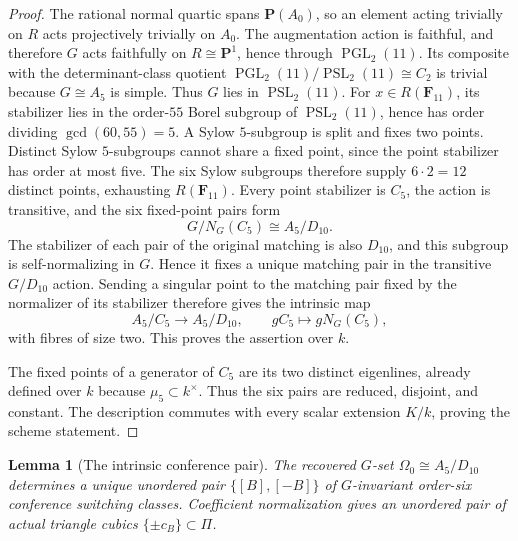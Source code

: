 \documentclass[11pt]{article}
\newtheorem{lemma}[theorem]{Lemma}
\theoremstyle{definition}
\theoremstyle{remark}
\newcommand{\F}{\mathbf F}
\newcommand{\PP}{\mathbf P}
\newcommand{\PGL}{\operatorname{PGL}}
\begin{document}
\begin{proof}
The rational normal quartic spans \(\PP(A_0)\), so an element acting trivially
on \(R\) acts projectively trivially on \(A_0\).  The augmentation action is
faithful, and therefore \(G\) acts faithfully on \(R\cong\PP^1\), hence through
\(\PGL_2(11)\).  Its composite with the determinant-class quotient
\(\PGL_2(11)/\operatorname{PSL}_2(11)\cong C_2\) is trivial because
\(G\cong A_5\) is simple.  Thus \(G\) lies in
\(\operatorname{PSL}_2(11)\).  For \(x\in R(\F_{11})\), its
stabilizer lies in the
order-\(55\) Borel subgroup of \(\operatorname{PSL}_2(11)\), hence has order
dividing \(\gcd(60,55)=5\).  A Sylow \(5\)-subgroup is split and fixes two
points.  Distinct Sylow \(5\)-subgroups cannot share a fixed point, since
the point stabilizer has order at most five.  The six Sylow subgroups
therefore supply \(6\cdot2=12\) distinct points, exhausting \(R(\F_{11})\).
Every point stabilizer is \(C_5\), the action is transitive, and the six
fixed-point pairs form
\[
 G/N_G(C_5)\cong A_5/D_{10}.
\]
The stabilizer of each pair of the original matching is also \(D_{10}\), and
this subgroup is self-normalizing in \(G\).  Hence it fixes a unique matching
pair in the transitive \(G/D_{10}\) action.  Sending a singular point
to the matching pair fixed by the normalizer of its stabilizer therefore
gives the intrinsic map
\[
 A_5/C_5\longrightarrow A_5/D_{10},
 \qquad gC_5\longmapsto gN_G(C_5),
\]
with fibres of size two.  This proves the assertion over \(k\).

The fixed points of a generator of \(C_5\) are its two distinct eigenlines,
already defined over \(k\) because \(\mu_5\subset k^\times\).  Thus the six
pairs are reduced, disjoint, and constant.  The description commutes with
every scalar extension \(K/k\), proving the scheme statement.
\end{proof}

\begin{lemma}[The intrinsic conference pair]
\label{lem:unoriented-conference-companion}
The recovered \(G\)-set \(\Omega_0\cong A_5/D_{10}\) determines a unique
unordered pair \(\{[B],[-B]\}\) of \(G\)-invariant order-six conference
switching classes.  Coefficient normalization gives an unordered pair of
actual triangle cubics \(\{\pm c_B\}\subset\Pi\).
\end{lemma}
\end{document}
